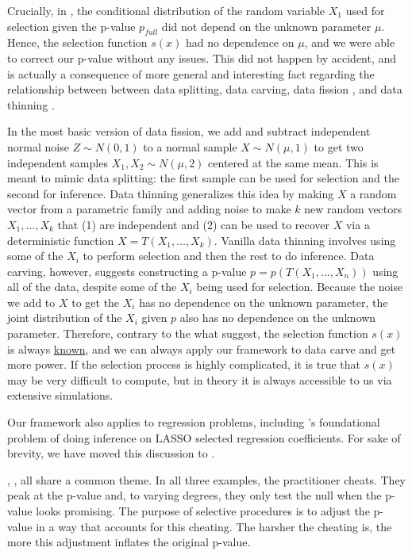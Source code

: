\documentclass{article}
\begin{document}
Crucially, in , the conditional distribution of the random variable $X_1$ used for selection given the p-value $p_{full}$ did not depend on the unknown parameter $\mu$. Hence, the selection function $s(x)$ had no dependence on $\mu$, and we were able to correct our p-value without any issues. This did not happen by accident, and is actually a consequence of more general and interesting fact regarding the relationship between between data splitting, data carving, data fission \citep{Leiner}, and data thinning \citep{Dharamshi, Neufeld}.

In the most basic version of data fission, we add and subtract independent normal noise $Z \sim N(0, 1)$ to a normal sample $X \sim N(\mu, 1)$ to get two independent samples $X_1, X_2 \sim N(\mu, 2)$ centered at the same mean. This is meant to mimic data splitting: the first sample can be used for selection and the second for inference. Data thinning generalizes this idea by making $X$ a random vector from a parametric family and adding noise to make $k$ new random vectors $X_1, \dots, X_k$ that (1) are independent and (2) can be used to recover $X$ via a deterministic function $X = T(X_1, \dots, X_k)$. Vanilla data thinning involves using some of the $X_i$ to perform selection and then the rest to do inference. Data carving, however, suggests constructing a p-value $p = p(T(X_1, \dots, X_n))$ using all of the data, despite some of the $X_i$ being used for selection. Because the noise we add to $X$ to get the $X_i$ has no dependence on the unknown parameter, the joint distribution of the $X_i$ given $p$ also has no dependence on the unknown parameter. Therefore, contrary to the what \cite{Leiner} suggest, the selection function $s(x)$ is always \underline{known}, and we can always apply our framework to data carve and get more power. If the selection process is highly complicated, it is true that $s(x)$ may be very difficult to compute, but in theory it is always accessible to us via extensive simulations. 

Our framework also applies to regression problems, including \cite{2016}'s foundational problem of doing inference on LASSO selected regression coefficients. For sake of brevity, we have moved this discussion to .  

, ,  all share a common theme. In all three examples, the practitioner cheats. They peak at the p-value and, to varying degrees, they only test the null when the p-value looks promising. The purpose of selective procedures is to adjust the p-value in a way that accounts for this cheating. The harsher the cheating is, the more this adjustment inflates the original p-value. 
\end{document}
